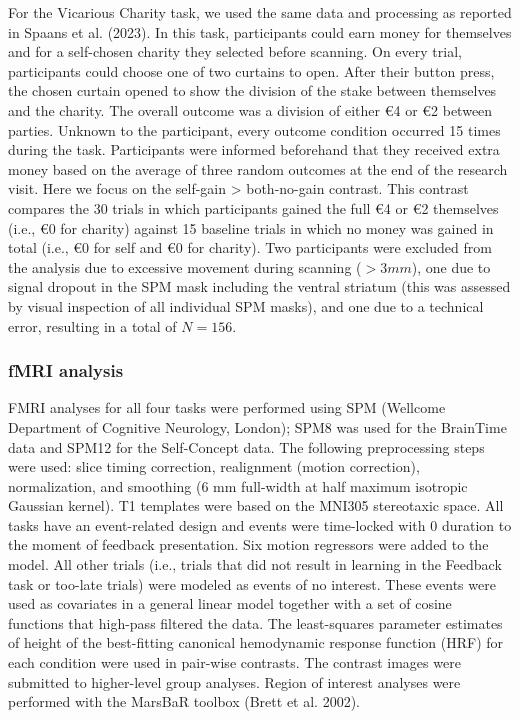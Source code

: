 \documentclass[
  letterpaper,
  DIV=11,
  numbers=noendperiod]{scrartcl}
\begin{document}
For the Vicarious Charity task, we used the same data and processing as
reported in Spaans et al. (2023). In this task, participants could earn
money for themselves and for a self-chosen charity they selected before
scanning. On every trial, participants could choose one of two curtains
to open. After their button press, the chosen curtain opened to show the
division of the stake between themselves and the charity. The overall
outcome was a division of either €4 or €2 between parties. Unknown to
the participant, every outcome condition occurred 15 times during the
task. Participants were informed beforehand that they received extra
money based on the average of three random outcomes at the end of the
research visit. Here we focus on the self-gain \textgreater{}
both-no-gain contrast. This contrast compares the 30 trials in which
participants gained the full €4 or €2 themselves (i.e., €0 for charity)
against 15 baseline trials in which no money was gained in total (i.e.,
€0 for self and €0 for charity). Two participants were excluded from the
analysis due to excessive movement during scanning (\(>3 mm\)), one due
to signal dropout in the SPM mask including the ventral striatum (this
was assessed by visual inspection of all individual SPM masks), and one
due to a technical error, resulting in a total of \(N = 156\).

\subsubsection{fMRI analysis}\label{fmri-analysis}

FMRI analyses for all four tasks were performed using SPM (Wellcome
Department of Cognitive Neurology, London); SPM8 was used for the
BrainTime data and SPM12 for the Self-Concept data. The following
preprocessing steps were used: slice timing correction, realignment
(motion correction), normalization, and smoothing (6 mm full-width at
half maximum isotropic Gaussian kernel). T1 templates were based on the
MNI305 stereotaxic space. All tasks have an event-related design and
events were time-locked with 0 duration to the moment of feedback
presentation. Six motion regressors were added to the model. All other
trials (i.e., trials that did not result in learning in the Feedback
task or too-late trials) were modeled as events of no interest. These
events were used as covariates in a general linear model together with a
set of cosine functions that high-pass filtered the data. The
least-squares parameter estimates of height of the best-fitting
canonical hemodynamic response function (HRF) for each condition were
used in pair-wise contrasts. The contrast images were submitted to
higher-level group analyses. Region of interest analyses were performed
with the MarsBaR toolbox (Brett et al. 2002).
\end{document}
